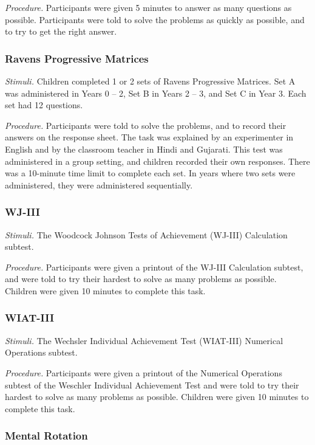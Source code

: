\documentclass[11pt]{article}
\begin{document}
{\it Procedure.} Participants were given 5 minutes to answer as many questions as possible. Participants were told to solve the problems as quickly as possible, and to try to get the right answer.

\subsubsection{Ravens Progressive Matrices}

{\it Stimuli.} Children completed 1 or 2 sets of Ravens Progressive Matrices. Set A was administered in Years 0 -- 2, Set B in Years 2 -- 3, and Set C in Year 3. Each set had 12 questions.

{\it Procedure.} Participants were told to solve the problems, and to record their answers on the response sheet. The task was explained by an experimenter in English and by the classroom teacher in Hindi and Gujarati. This test was administered in a group setting, and children recorded their own responses. There was a 10-minute time limit to complete each set. In years where two sets were administered, they were administered sequentially.

\subsubsection{WJ-III}

{\it Stimuli.} The Woodcock Johnson Tests of Achievement (WJ-III) Calculation subtest.

{\it Procedure.} Participants were given a printout of the WJ-III Calculation subtest, and were told to try their hardest to solve as many problems as possible. Children were given 10 minutes to complete this task.

\subsubsection{WIAT-III}

{\it Stimuli.} The Wechsler Individual Achievement Test (WIAT-III) Numerical Operations subtest.

{\it Procedure.} Participants were given a printout of the Numerical Operations subtest of the Weschler Individual Achievement Test and were told to try their hardest to solve as many problems as possible. Children were given 10 minutes to complete this task.

\subsubsection{Mental Rotation}
\end{document}

